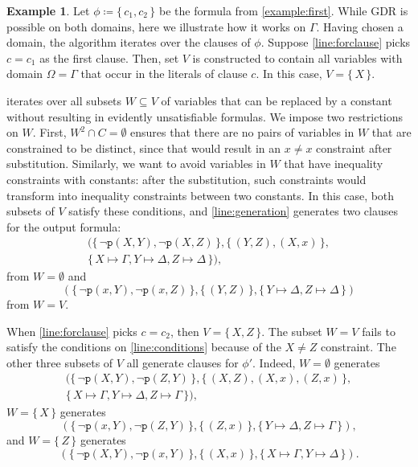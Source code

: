 \documentclass{article}
\theoremstyle{definition}
\newtheorem{example}{Example}
\theoremstyle{remark}
\begin{document}
\begin{example}
  Let $\phi \coloneqq \{\, c_1, c_2 \,\}$ be the formula from
  \cref{example:first}. While GDR is possible on both domains, here we
  illustrate how it works on $\Gamma$. Having chosen a domain, the algorithm
  iterates over the clauses of $\phi$. Suppose \cref{line:forclause} picks
  $c = c_1$ as the first clause. Then, set $V$ is constructed to contain all
  variables with domain $\Omega = \Gamma$ that occur in the literals of clause
  $c$. In this case, $V = \{\, X \,\}$.

   iterates over all subsets $W \subseteq V$ of variables
  that can be replaced by a constant without resulting in evidently
  unsatisfiable formulas. We impose two restrictions on $W$. First,
  $W^2 \cap C = \emptyset$ ensures that there are no pairs of variables in $W$
  that are constrained to be distinct, since that would result in an $x \ne x$
  constraint after substitution. Similarly, we want to avoid variables in $W$
  that have inequality constraints with constants: after the substitution, such
  constraints would transform into inequality constraints between two constants.
  In this case, both subsets of $V$ satisfy these conditions, and
  \cref{line:generation} generates two clauses for the output formula:
  \begin{multline*}
    (\{\, \neg \texttt{p}(X, Y), \neg \texttt{p}(X, Z) \,\}, \{\, (Y, Z), (X, x) \,\}, \\
    \{\, X \mapsto \Gamma, Y \mapsto \Delta, Z \mapsto \Delta \,\}),
  \end{multline*}
  from $W = \emptyset$ and
  \[
    (\{\, \neg \texttt{p}(x, Y), \neg \texttt{p}(x, Z) \,\}, \{\, (Y, Z) \,\}, \{\, Y \mapsto \Delta, Z \mapsto \Delta \,\})
  \]
  from $W = V$.

  When \cref{line:forclause} picks $c = c_2$, then $V = \{\, X, Z \,\}$. The
  subset $W = V$ fails to satisfy the conditions on \cref{line:conditions}
  because of the $X \ne Z$ constraint. The other three subsets of $V$ all
  generate clauses for $\phi'$. Indeed, $W = \emptyset$ generates
  \begin{multline*}
    (\{\, \neg \texttt{p}(X, Y), \neg \texttt{p}(Z, Y) \,\}, \{\, (X, Z), (X, x), (Z, x) \,\}, \\
    \{\, X \mapsto \Gamma, Y \mapsto \Delta, Z \mapsto \Gamma \,\}),
  \end{multline*}
  $W = \{\, X \,\}$ generates
  \[
    (\{\, \neg \texttt{p}(x, Y), \neg \texttt{p}(Z, Y) \,\}, \{\, (Z, x) \,\}, \{\, Y \mapsto \Delta, Z \mapsto \Gamma \,\}),
  \]
  and $W = \{\, Z \,\}$ generates
  \[
    (\{\, \neg \texttt{p}(X, Y), \neg \texttt{p}(x, Y) \,\}, \{\, (X, x) \,\}, \{\, X \mapsto \Gamma, Y \mapsto \Delta \,\}).
  \]
\end{example}
\end{document}
